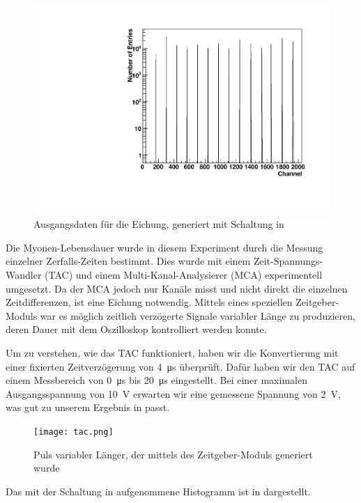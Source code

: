 \begin{figure}[ht!]
  \centering
  \includegraphics[width=\columnwidth,keepaspectratio=true]{eichung}
  \caption{Ausgangsdaten für die Eichung, generiert mit Schaltung in }
  \label{fig:eichung}
\end{figure}

Die Myonen-Lebensdauer wurde in diesem Experiment durch die Messung einzelner
Zerfalls-Zeiten bestimmt. Dies wurde mit einem Zeit-Spannungs-Wandler (TAC) und
einem Multi-Kanal-Analysierer (MCA) experimentell umgesetzt. Da der MCA jedoch
nur Kanäle misst und nicht direkt die einzelnen Zeitdifferenzen, ist eine
Eichung notwendig. Mittels eines speziellen Zeitgeber-Moduls war es möglich
zeitlich verzögerte Signale variabler Länge zu produzieren, deren Dauer mit dem
Oszilloskop kontrolliert werden konnte.

Um zu verstehen, wie das TAC funktioniert, haben wir die Konvertierung mit einer
fixierten Zeitverzögerung von \SI{4}{\micro\second} überprüft. Dafür haben wir den
TAC auf einem Messbereich von \SI{0}{\micro\second} bis \SI{20}{\micro\second}
eingestellt. Bei einer maximalen Ausgangsspannung von \SI{10}{\volt} erwarten wir
eine gemessene Spannung von \SI{2}{\volt}, was gut zu unserem Ergebnis in 
passt.

\begin{figure}[ht!]
  \centering
  \texttt{[image: tac.png]}
  \caption{Puls variabler Länger, der mittels des Zeitgeber-Moduls generiert wurde}
  \label{fig:tac}
\end{figure}


Das mit der Schaltung in  aufgenommene Histogramm ist in  dargestellt.

